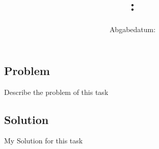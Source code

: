 \documentclass[oneside]{article}
\title{
    \textsf{\textbf{\hmwkSubject: \hmwkTitle}}
}
\author{\hmwkAuthor}
\date{Abgabedatum: \hmwkDueDate}
\begin{document}
\maketitle
\thispagestyle{firststyle}
\vspace{1cm}

\subsection*{Problem}
Describe the problem of this task

\subsection*{Solution}
My Solution for this task

\label{LastPage}
\end{document}
